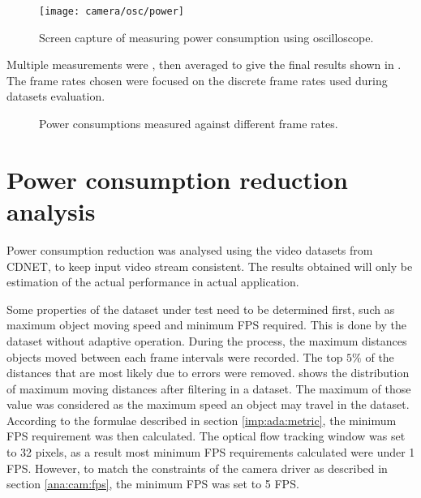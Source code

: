 \begin{figure}[htb]
  \centering
  \texttt{[image: camera/osc/power]}
  \caption{Screen capture of measuring power consumption using oscilloscope.}
  \label{ana:cam:osc:power}
\end{figure}

Multiple measurements were , then averaged to give the final results shown in . The frame rates chosen were focused on the discrete frame rates used during datasets evaluation.

\begin{figure}[htb]
  \centering
  \centering
  \caption{Power consumptions measured against different frame rates.}
  \label{ana:cam:power}
\end{figure}


\section{Power consumption reduction analysis}

Power consumption reduction was analysed using the video datasets from CDNET, to keep input video stream consistent.  The results obtained will only be  estimation of the actual performance in actual application.

Some properties of the dataset under test need to be determined first, such as maximum object moving speed and minimum FPS required. This is done by  the dataset without adaptive operation. During the process, the maximum distances objects moved between each frame intervals were recorded. The top $5 \%$ of the distances that are most likely due to errors were removed.  shows the distribution of maximum moving distances after filtering in a dataset. The maximum of those value was considered as the maximum speed  an object may travel in the dataset. According to the formulae described in section \ref{imp:ada:metric}, the minimum FPS requirement was then calculated. The optical flow tracking window was set to 32 pixels, as a result most minimum FPS requirements calculated were under 1 FPS. However, to match the constraints of the camera driver as described in section \ref{ana:cam:fps}, the minimum FPS was set to 5 FPS.

